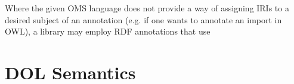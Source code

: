 \documentclass[10pt,fleqn,%
\ifpretendfinal
final%
\else
draft%
\fi,
]{scrreprt}
\makeatletter
\newcommand*{\eg}{e.g.\@\xspace}
\newcommand*{\CL}{\ensuremath{\mathsf{CL}}\xspace}
\newcommand{\clause}[1]{\chapter{#1}}
\makeatother
\begin{document}
Where the given OMS language does not provide a way of assigning IRIs to a desired subject of an annotation (\eg if one wants to annotate an import in OWL), a library may employ RDF annotations that use 

\clause{DOL Semantics}\label{c:semantics}

%
%

\end{document}
